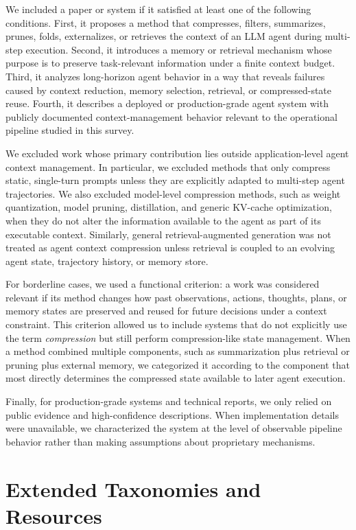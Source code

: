 We included a paper or system if it satisfied at least one of the following conditions. First, it proposes a method that compresses, filters, summarizes, prunes, folds, externalizes, or retrieves the context of an LLM agent during multi-step execution. Second, it introduces a memory or retrieval mechanism whose purpose is to preserve task-relevant information under a finite context budget. Third, it analyzes long-horizon agent behavior in a way that reveals failures caused by context reduction, memory selection, retrieval, or compressed-state reuse. Fourth, it describes a deployed or production-grade agent system with publicly documented context-management behavior relevant to the operational pipeline studied in this survey.

We excluded work whose primary contribution lies outside application-level agent context management. In particular, we excluded methods that only compress static, single-turn prompts unless they are explicitly adapted to multi-step agent trajectories. We also excluded model-level compression methods, such as weight quantization, model pruning, distillation, and generic KV-cache optimization, when they do not alter the information available to the agent as part of its executable context. Similarly, general retrieval-augmented generation was not treated as agent context compression unless retrieval is coupled to an evolving agent state, trajectory history, or memory store.

For borderline cases, we used a functional criterion: a work was considered relevant if its method changes how past observations, actions, thoughts, plans, or memory states are preserved and reused for future decisions under a context constraint. This criterion allowed us to include systems that do not explicitly use the term \textit{compression} but still perform compression-like state management. When a method combined multiple components, such as summarization plus retrieval or pruning plus external memory, we categorized it according to the component that most directly determines the compressed state available to later agent execution.

Finally, for production-grade systems and technical reports, we only relied on public evidence and high-confidence descriptions. When implementation details were unavailable, we characterized the system at the level of observable pipeline behavior rather than making assumptions about proprietary mechanisms.


\section{Extended Taxonomies and Resources}
\label{ap:extended_taxonomies}

